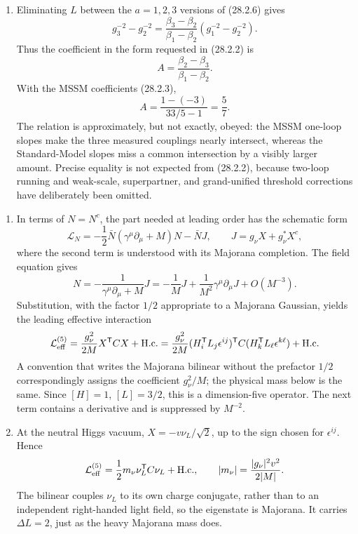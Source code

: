 \begin{enumerate}
\begin{enumerate}
    \item[(d)]
    Eliminating \(L\) between the \(a=1,2,3\) versions of (28.2.6) gives
    \[
      g_3^{-2}-g_2^{-2}
       =\frac{\beta_3-\beta_2}{\beta_1-\beta_2}
          (g_1^{-2}-g_2^{-2}).
    \]
    Thus the coefficient in the form requested in (28.2.2) is
    \[
      \boxed{A=\frac{\beta_2-\beta_3}{\beta_1-\beta_2}.}
      \tag{28.2.8}
    \]
    With the MSSM coefficients (28.2.3),
    \[
      \boxed{A=\frac{1-(-3)}{33/5-1}=\frac57.}
    \]
    The relation is approximately, but not exactly, obeyed: the MSSM
    one-loop slopes make the three measured couplings nearly intersect,
    whereas the Standard-Model slopes miss a common intersection by a visibly
    larger amount.  Precise equality is not expected from (28.2.2), because
    two-loop running and weak-scale, superpartner, and grand-unified threshold
    corrections have deliberately been omitted.
  \end{enumerate}

  \begin{enumerate}
    \item In terms of \(N=N^c\), the part needed at leading order has the
      schematic form
      \[
        \mathcal L_N
          =-\frac12\bar N(\gamma^\mu\partial_\mu+M)N
           -\bar N J,
        \qquad
        J=g_\nu X+g_\nu^*X^c,
      \]
      where the second term is understood with its Majorana completion.
      The field equation gives
      \[
        N=-\frac1{\gamma^\mu\partial_\mu+M}J
          =-\frac1M J+\frac1{M^2}\gamma^\mu\partial_\mu J
           +O(M^{-3}).
      \]
      Substitution, with the factor \(1/2\) appropriate to a Majorana
      Gaussian, yields the leading effective interaction
      \[
        \mathcal L_{\rm eff}^{(5)}
          =\frac{g_\nu^2}{2M}
             X^{\mathsf T}C X+\mathrm{H.c.}
          =\frac{g_\nu^2}{2M}
            (H_i^{\mathsf T}L_j\epsilon^{ij})^{\mathsf T}
            C(H_k^{\mathsf T}L_\ell\epsilon^{k\ell})
            +\mathrm{H.c.}
      \]
      A convention that writes the Majorana bilinear without the prefactor
      \(1/2\) correspondingly assigns the coefficient \(g_\nu^2/M\); the
      physical mass below is the same.  Since
      \([H]=1\), \([L]=3/2\), this is a dimension-five operator.  The next
      term contains a derivative and is suppressed by \(M^{-2}\).

    \item At the neutral Higgs vacuum,
      \(X=-v\nu_L/\sqrt2\), up to the sign chosen for
      \(\epsilon^{ij}\).  Hence
      \[
        \mathcal L_{\rm eff}^{(5)}
          =\frac12m_\nu\nu_L^{\mathsf T}C\nu_L+\mathrm{H.c.},
        \qquad
        |m_\nu|=\frac{|g_\nu|^2v^2}{2|M|}.
      \]
      The bilinear couples \(\nu_L\) to its own charge conjugate, rather
      than to an independent right-handed light field, so the eigenstate is
      Majorana.  It carries \(\Delta L=2\), just as the heavy Majorana mass
      does.


\end{enumerate}
\end{enumerate}
